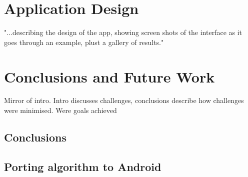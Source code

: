 \documentclass[11pt, a4paper]{report}
\begin{document}
\chapter{Application Design}
"...describing the design of the app, showing screen shots of the interface as it goes through an example, plust a gallery of results."




\chapter{Conclusions and Future Work}
Mirror of intro. Intro discusses challenges, conclusions describe how challenges were minimised. Were goals achieved

\section{Conclusions}

\section{Porting algorithm to Android}

{}

\end{document}

